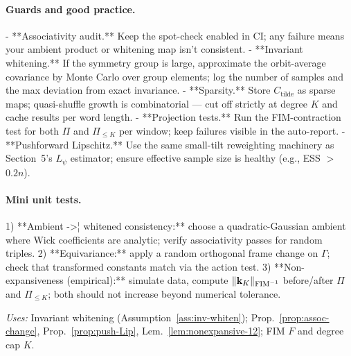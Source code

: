 \paragraph{Guards and good practice.}
- **Associativity audit.** Keep the spot-check enabled in CI; any failure means your ambient product or whitening map isn't consistent.  
- **Invariant whitening.** If the symmetry group is large, approximate the orbit-average covariance by Monte Carlo over group elements; log the number of samples and the max deviation from exact invariance.  
- **Sparsity.** Store \(C_{\text{tilde}}\) as sparse maps; quasi-shuffle growth is combinatorial --- cut off strictly at degree \(K\) and cache results per word length.  
- **Projection tests.** Run the FIM-contraction test for both \(\Pi\) and \(\Pi_{\le K}\) per window; keep failures visible in the auto-report.  
- **Pushforward Lipschitz.** Use the same small-tilt reweighting machinery as Section~5's \(L_\psi\) estimator; ensure effective sample size is healthy (e.g., ESS \(>\) \(0.2n\)).

\paragraph{Mini unit tests.}
1) **Ambient ->¦ whitened consistency:** choose a quadratic-Gaussian ambient where Wick coefficients are analytic; verify associativity passes for random triples.  
2) **Equivariance:** apply a random orthogonal frame change on \(\Gamma\); check that transformed constants match via the action test.  
3) **Non-expansiveness (empirical):** simulate data, compute \(\|\mathbf k_K\|_{\mathrm{FIM}^{-1}}\) before/after \(\Pi\) and \(\Pi_{\le K}\); both should not increase beyond numerical tolerance.

\emph{Uses: } Invariant whitening (Assumption~\ref{ass:inv-whiten}); Prop.~\ref{prop:assoc-change}, Prop.~\ref{prop:push-Lip}, Lem.~\ref{lem:nonexpansive-12}; FIM \(F\) and degree cap \(K\).


